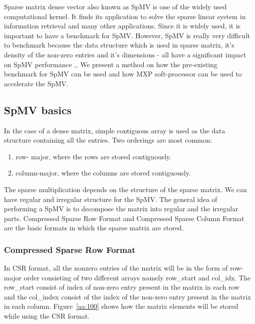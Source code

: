Sparse matrix dense vector also known as SpMV is one of the widely used computational kernel. It finds its application to solve the sparse linear system in information retrieval and many other applications. Since it is widely used, it is important to have a benchmark for SpMV. However, SpMV is really very difficult to benchmark because the data structure which is used in sparse matrix, it's density of the non-zero entries and it's dimensions - all have a significant impact on SpMV performance \cite{24},\cite{25}. We present a method on how the pre-existing benchmark for SpMV can be used and how MXP soft-processor can be used to accelerate the SpMV.

\subsection{SpMV basics}
	
In the case of a dense matrix, simple contiguous array is used as the data structure containing all the entries. Two orderings are most common: 
\begin{enumerate}

	\item row- major, where the rows are stored contiguously.
	\item column-major, where the columns are stored contiguously.
 
\end{enumerate}

The sparse multiplication depends on the structure of the sparse matrix. We can have regular and irregular structure for the SpMV. The general idea of performing a SpMV is to decompose the matrix into regular and the irregular parts. Compressed Sparse Row Format and Compressed Sparse Column Format are the basic formats in which the sparse matrix 
are stored.

\subsubsection{Compressed Sparse Row Format}

In CSR format, all the nonzero entries of the matrix will be in the form of row-major order consisting of two different arrays namely row\_start and col\_idx. The row\_start consist of index of non-zero entry present in the matrix in each row and the col\_index consist of the index of the non-zero entry present in the matrix in each column. Figure~\ref{aa:100} shows how the matrix elements will be stored while using the CSR format.

